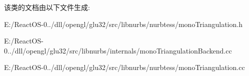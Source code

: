 该类的文档由以下文件生成\+:\begin{DoxyCompactItemize}
\item 
E\+:/\+React\+O\+S-\/0../dll/opengl/glu32/src/libnurbs/nurbtess/mono\+Triangulation.\+h\item 
E\+:/\+React\+O\+S-\/0../dll/opengl/glu32/src/libnurbs/internals/mono\+Triangulation\+Backend.\+cc\item 
E\+:/\+React\+O\+S-\/0../dll/opengl/glu32/src/libnurbs/nurbtess/mono\+Triangulation.\+cc\end{DoxyCompactItemize}
